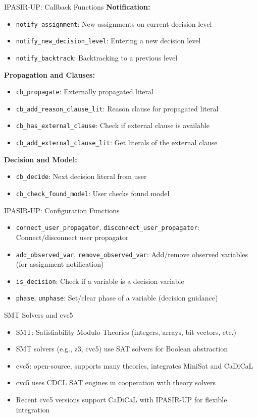 \documentclass{beamer}
\newcommand*{\code}[1]{\lstinline[basicstyle=\ttfamily, breaklines]|#1|}
\begin{document}
\begin{frame}{IPASIR-UP: Callback Functions}
  \textbf{Notification:}
  \begin{itemize}
    \item \code{notify_assignment}: New assignments on current decision level
    \item \code{notify_new_decision_level}: Entering a new decision level
    \item \code{notify_backtrack}: Backtracking to a previous level
  \end{itemize}
  \textbf{Propagation and Clauses:}
  \begin{itemize}
    \item \code{cb_propagate}: Externally propagated literal
    \item \code{cb_add_reason_clause_lit}: Reason clause for propagated literal
    \item \code{cb_has_external_clause}: Check if external clause is available
    \item \code{cb_add_external_clause_lit}: Get literals of the external clause
  \end{itemize}
  \textbf{Decision and Model:}
  \begin{itemize}
    \item \code{cb_decide}: Next decision literal from user
    \item \code{cb_check_found_model}: User checks found model
  \end{itemize}
\end{frame}

\begin{frame}{IPASIR-UP: Configuration Functions}
  \begin{itemize}
    \item \code{connect_user_propagator}, \code{disconnect_user_propagator}: Connect/disconnect user propagator
    \item \code{add_observed_var}, \code{remove_observed_var}: Add/remove observed variables (for assignment notification)
    \item \code{is_decision}: Check if a variable is a decision variable
    \item \code{phase}, \code{unphase}: Set/clear phase of a variable (decision guidance)
  \end{itemize}
\end{frame}

\begin{frame}{SMT Solvers and cvc5}
  \begin{itemize}
    \item SMT: Satisfiability Modulo Theories (integers, arrays, bit-vectors, etc.)
    \item SMT solvers (e.g., z3, cvc5) use SAT solvers for Boolean abstraction
    \item cvc5: open-source, supports many theories, integrates MiniSat and CaDiCaL
    \item cvc5 uses CDCL SAT engines in cooperation with theory solvers
    \item Recent cvc5 versions support CaDiCaL with IPASIR-UP for flexible integration
  \end{itemize}
\end{frame}
\end{document}
